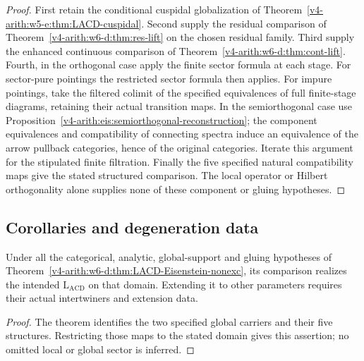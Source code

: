 \begin{proof}
First retain the conditional cuspidal globalization of
Theorem~\ref{v4-arith:w5-e:thm:LACD-cuspidal}. Second supply the
residual comparison of Theorem~\ref{v4-arith:w6-d:thm:res-lift}
on the chosen residual family. Third supply the enhanced continuous
comparison of Theorem~\ref{v4-arith:w6-d:thm:cont-lift}.
Fourth, in the orthogonal case apply the finite sector formula at
each stage. For sector-pure pointings the restricted sector formula
then applies. For impure pointings, take the filtered colimit of the
specified equivalences of full finite-stage diagrams, retaining their
actual transition maps. In the semiorthogonal case use
Proposition~\ref{v4-arith:eis:semiorthogonal-reconstruction}; the
component equivalences and compatibility of connecting spectra induce
an equivalence of the arrow pullback categories, hence of the original
categories. Iterate this argument for the stipulated finite filtration.
Finally the five specified natural compatibility maps give the stated
structured comparison. The local operator or Hilbert orthogonality
alone supplies none of these component or gluing hypotheses.
\end{proof}

\subsection{Corollaries and degeneration data}
\begin{corollary}
\label{v4-arith:w6-d:cor:full-LACD-nonexc}
Under all the categorical, analytic, global-support and gluing hypotheses
of Theorem~\ref{v4-arith:w6-d:thm:LACD-Eisenstein-nonexc}, its
comparison realizes the intended $\mathrm L_{\mathrm{ACD}}$ on that
domain. Extending it to other parameters requires their actual
intertwiners and extension data.
\end{corollary}
\begin{proof}
The theorem identifies the two specified global carriers and their
five structures. Restricting those maps to the stated domain gives
this assertion; no omitted local or global sector is inferred.
\end{proof}

